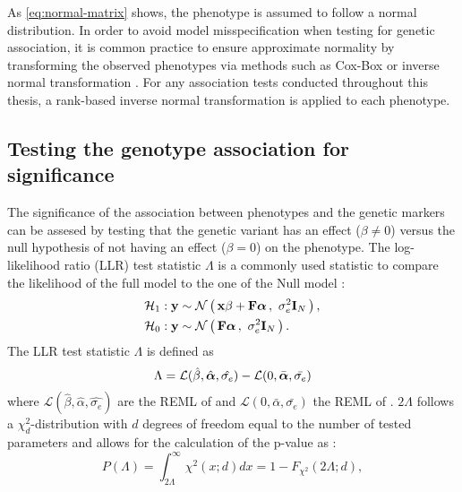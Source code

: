 As \cref{eq:normal-matrix} shows, the phenotype is assumed to follow a normal distribution. In order to avoid model misspecification when testing for genetic association, it is common practice to ensure approximate normality by transforming the observed phenotypes via methods such as Cox-Box \citep{Etzel2003,Yang2006} or inverse normal transformation \citep{Scuteri2007,Guan2008,Anttila2010,Casale2015}. For any association tests conducted throughout this thesis, a rank-based inverse normal transformation is applied to each phenotype.

\subsection{Testing the genotype association for significance}
\label{subsection:hypothesis-testing}
The significance of the association between phenotypes and the genetic markers can be assesed by testing that the genetic variant has an effect (\(\beta \neq 0\)) versus the null hypothesis \tnullH of not having an effect (\(\beta = 0\)) on the phenotype. The log-likelihood ratio (LLR) test statistic \(\Lambda\) is a commonly used statistic to compare the likelihood of the full model \taltH to the one of the Null model \tnullH:
%
\begin{align}
\mathcal{H}_1&: \boldsymbol{\mathbf{y}} \sim \mathcal{N}\left(\,{\boldsymbol{\mathbf{x}}\beta + \boldsymbol{\mathbf{F}}\boldsymbol{\mathbf{\alpha}}}\,,~{\sigma_e^2\boldsymbol{\mathbf{I}}_{N}}\,\right),\label{eq:lm_alt} \\
\mathcal{H}_0&: \boldsymbol{\mathbf{y}} \sim \mathcal{N}\left(\,{\boldsymbol{\mathbf{F}}\boldsymbol{\mathbf{\alpha}}}\,,~{\sigma_e^2\boldsymbol{\mathbf{I}}_{N}}\,\right). \label{eq:lm_null}
\end{align}
%
The LLR test statistic \(\Lambda\) is defined as
\begin{equation}
\Lambda  =  \mathcal{L} (\hat{\beta}, \hat{\boldsymbol{\mathbf{\alpha}}}, \hat{\sigma_{e}}) -  \mathcal{L} (0, \bar{\boldsymbol{\mathbf{\alpha}}}, \bar{\sigma_{e}})
\label{eq:llr}
\end{equation}
%
where \(\mathcal{L} (\hat{\beta}, \hat{\alpha}, \hat{\sigma_{e}})\) are the REML of \taltH and \(\mathcal{L} (0, \bar{\alpha}, \bar{\sigma_{e}})\) the REML of \tnullH. \(2\Lambda\) follows a \(\chi^2_{d}\)-distribution with \(d\) degrees of freedom equal to the number of tested parameters \citep{Wilks1938} and allows for the calculation of the p-value as :
\begin{equation}
P(\Lambda) = \int_{2\Lambda}^{\infty} \chi^2 \left(x;d\right)dx = 1- F_{\chi^2}\left(2\Lambda; d\right),
\label{eq:pvalue}
\end{equation}
